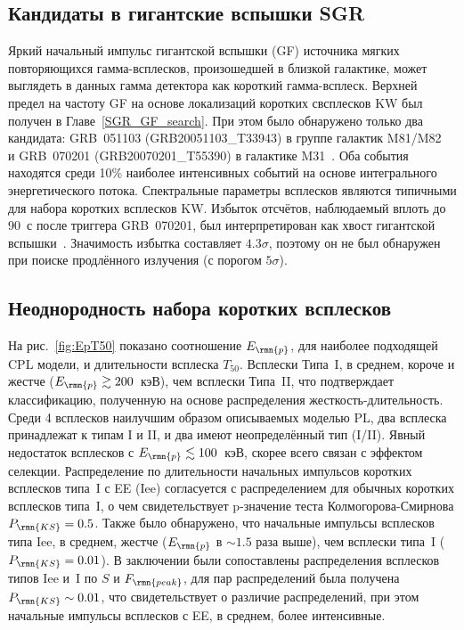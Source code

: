 \subsection{Кандидаты в гигантские вспышки SGR}
Яркий начальный импульс гигантской вспышки (GF) источника мягких повторяющихся гамма-всплесков, 
произошедшей в близкой галактике, может выглядеть в данных гамма детектора как короткий гамма-всплеск. 
Верхней предел на частоту GF на основе локализаций коротких свсплесков KW был
получен в Главе~\ref{SGR_GF_search}. При этом было обнаружено только два кандидата:
GRB~051103 (GRB20051103\_T33943) в группе галактик M81/M82~\citep{Frederiks_2007AstLett} и 
GRB~070201 (GRB20070201\_T55390) в галактике M31~\citep{Mazets_2008ApJ}.
Оба события находятся среди 10\% наиболее интенсивных событий на основе интегрального 
энергетического потока. Спектральные параметры всплесков являются типичными для 
набора коротких всплесков KW.
Избыток отсчётов, наблюдаемый вплоть до 90~с после триггера GRB~070201, 
был интерпретирован как хвост гигантской вспышки~\citep{Mazets_2008ApJ}.
Значимость избытка составляет $4.3\sigma$, поэтому он не был обнаружен при 
поиске продлённого излучения (с порогом $5\sigma$).

\subsection{Неоднородность набора коротких всплесков}
На рис.~\ref{fig:EpT50} показано соотношение $E_\rmn{p}$, для наиболее подходящей CPL модели,
и длительности всплеска $T_{50}$. Всплески Типа~I, в среднем, короче и жестче 
($E_\rmn{p}\gtrsim 200$~кэВ), чем всплески Типа~II, что подтверждает классификацию,
полученную на основе распределения жесткость-длительность.
Среди 4 всплесков наилучшим образом описываемых моделью PL, два всплеска принадлежат к типам I и II,
и два имеют неопределённый тип (I/II). Явный недостаток всплесков с $E_\rmn{p}\lesssim 100$~кэВ,
скорее всего связан с эффектом селекции. 
Распределение по длительности начальных импульсов коротких всплесков типа~I с EE (Iee) согласуется с 
распределением для обычных коротких всплесков типа~I, о чем свидетельствует p-значение
теста Колмогорова-Смирнова $P_\rmn{KS}=0.5$. Также было обнаружено, что
начальные импульсы всплесков типа Iee, в среднем, жестче ($E_\rmn{p}$ в $\sim 1.5$ раза выше),
чем всплески типа~I ($P_\rmn{KS} = 0.01$). В заключении были сопоставлены распределения 
всплесков типов Iee и~I по $S$ и $F_\rmn{peak}$, для пар распределений 
была получена $P_\rmn{KS} \sim 0.01$, что свидетельствует о различие распределений,
при этом начальные импульсы всплесков с EE, в среднем, более интенсивные.

